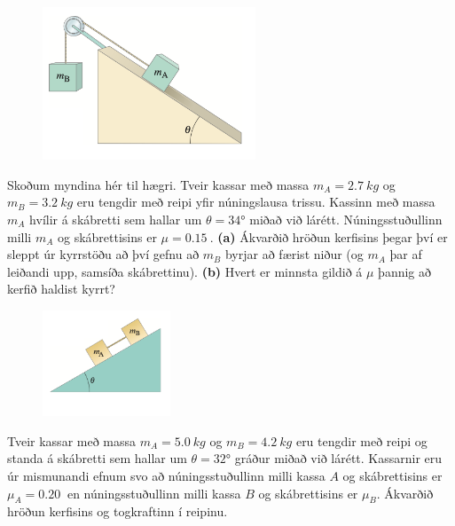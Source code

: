 \ifdefined \wholebook \else\documentclass[oneside]{book}\usepackage{EdlBook}\graphicspath{{figures/}}
\begin{document}
\begin{enumerate}[label = \textbf{Dæmi \thechapter.\arabic*.}]
\vspace{0.3cm}

\begin{minipage}{\linewidth}
\begin{figure}
\vspace{-1cm}
\includegraphics[width=2.5in]{images/hanger.png}
\end{figure}

\item Skoðum myndina hér til hægri. Tveir kassar með massa $m_A = \SI{2.7}{kg}$ og $m_B = \SI{3.2}{kg}$ eru tengdir með reipi yfir núningslausa trissu. Kassinn með massa $m_A$ hvílir á skábretti sem hallar um $\theta = \ang{34}$ miðað við lárétt.  Núningsstuðullinn milli $m_A$ og skábrettisins er $\mu = \SI{0.15}{}$. \textbf{(a)} Ákvarðið hröðun kerfisins þegar því er sleppt úr kyrrstöðu að því gefnu að $m_B$ byrjar að færist niður (og $m_A$ þar af leiðandi upp, samsíða skábrettinu).  \textbf{(b)} Hvert er minnsta gildið á $\mu$ þannig að kerfið haldist kyrrt?

\end{minipage}

\vspace{0.3cm}

\begin{minipage}{\linewidth}
\begin{figure}
\vspace{-0.5cm}
\includegraphics[width=1.5in]{images/skabr3.png}
\end{figure}

\item Tveir kassar með massa $m_A = \SI{5.0}{kg}$ og $m_B = \SI{4.2}{kg}$ eru tengdir með reipi og standa á skábretti sem hallar um $\theta = \ang{32}$ gráður miðað við lárétt. Kassarnir eru úr mismunandi efnum svo að núningsstuðullinn milli kassa $A$ og skábrettisins er $\mu_A = \SI{0.20}{}$ en núningsstuðullinn milli kassa $B$ og skábrettisins er $\mu_B$. Ákvarðið hröðun kerfisins og togkraftinn í reipinu.
\end{minipage}


\end{enumerate}
\end{document}
